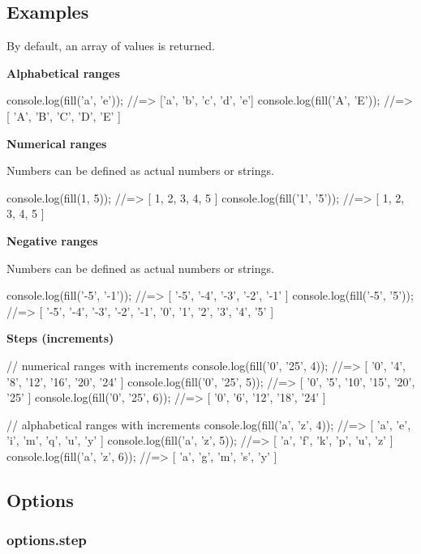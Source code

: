 \subsection*{Examples}

By default, an array of values is returned.

{\bfseries Alphabetical ranges}


\begin{DoxyCode}
console.log(fill('a', 'e')); //=> ['a', 'b', 'c', 'd', 'e']
console.log(fill('A', 'E')); //=> [ 'A', 'B', 'C', 'D', 'E' ]
\end{DoxyCode}


{\bfseries Numerical ranges}

Numbers can be defined as actual numbers or strings.


\begin{DoxyCode}
console.log(fill(1, 5));     //=> [ 1, 2, 3, 4, 5 ]
console.log(fill('1', '5')); //=> [ 1, 2, 3, 4, 5 ]
\end{DoxyCode}


{\bfseries Negative ranges}

Numbers can be defined as actual numbers or strings.


\begin{DoxyCode}
console.log(fill('-5', '-1')); //=> [ '-5', '-4', '-3', '-2', '-1' ]
console.log(fill('-5', '5')); //=> [ '-5', '-4', '-3', '-2', '-1', '0', '1', '2', '3', '4', '5' ]
\end{DoxyCode}


{\bfseries Steps (increments)}


\begin{DoxyCode}
// numerical ranges with increments
console.log(fill('0', '25', 4)); //=> [ '0', '4', '8', '12', '16', '20', '24' ]
console.log(fill('0', '25', 5)); //=> [ '0', '5', '10', '15', '20', '25' ]
console.log(fill('0', '25', 6)); //=> [ '0', '6', '12', '18', '24' ]

// alphabetical ranges with increments
console.log(fill('a', 'z', 4)); //=> [ 'a', 'e', 'i', 'm', 'q', 'u', 'y' ]
console.log(fill('a', 'z', 5)); //=> [ 'a', 'f', 'k', 'p', 'u', 'z' ]
console.log(fill('a', 'z', 6)); //=> [ 'a', 'g', 'm', 's', 'y' ]
\end{DoxyCode}


\subsection*{Options}

\subsubsection*{options.\+step}

